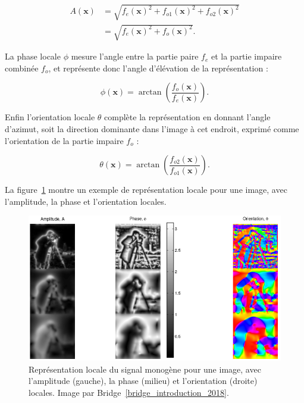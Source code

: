 \begin{align}
    A(\mathbf{x}) &= \sqrt{f_e(\mathbf{x})^2 + f_{o1}(\mathbf{x})^2 + f_{o2}(\mathbf{x})^2} \\
    &= \sqrt{f_e(\mathbf{x})^2 + f_o(\mathbf{x})^2}.
\end{align}

La phase locale $\phi$ mesure l'angle entre la partie paire $f_e$ et la partie impaire combinée $f_o$, et représente donc l'angle d'élévation de la représentation :

\begin{equation}
    \phi(\mathbf{x}) = \arctan\left(\frac{f_o(\mathbf{x})}{f_e(\mathbf{x})}\right).
\end{equation}

Enfin l'orientation locale $\theta$ complète la représentation en donnant l'angle d'azimut, soit la direction dominante dans l'image à cet endroit, exprimé comme l'orientation de la partie impaire $f_o$ :

\begin{equation}
    \theta(\mathbf{x}) = \arctan\left(\frac{f_{o2}(\mathbf{x})}{f_{o1}(\mathbf{x})}\right).
\end{equation}

La figure~\ref{fig:monogenic-local-representation} montre un exemple de représentation locale pour une image, avec l'amplitude, la phase et l'orientation locales.

\begin{figure}
    \centering
    \includegraphics[width=\textwidth]{contenu/resources/images/local_information_monogenic}
    \caption[Représentation locale du signal monogène]{Représentation locale du signal monogène pour une image, avec l'amplitude (gauche), la phase (milieu) et l'orientation (droite) locales. Image par Bridge~\ref{bridge_introduction_2018}.}
    \label{fig:monogenic-local-representation}
\end{figure}


